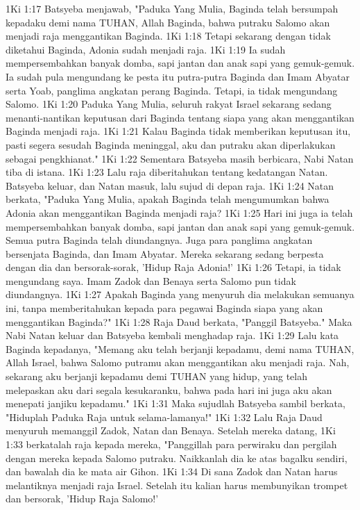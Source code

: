 1Ki 1:17  Batsyeba menjawab, "Paduka Yang Mulia, Baginda telah bersumpah kepadaku demi nama TUHAN, Allah Baginda, bahwa putraku Salomo akan menjadi raja menggantikan Baginda.
1Ki 1:18  Tetapi sekarang dengan tidak diketahui Baginda, Adonia sudah menjadi raja.
1Ki 1:19  Ia sudah mempersembahkan banyak domba, sapi jantan dan anak sapi yang gemuk-gemuk. Ia sudah pula mengundang ke pesta itu putra-putra Baginda dan Imam Abyatar serta Yoab, panglima angkatan perang Baginda. Tetapi, ia tidak mengundang Salomo.
1Ki 1:20  Paduka Yang Mulia, seluruh rakyat Israel sekarang sedang menanti-nantikan keputusan dari Baginda tentang siapa yang akan menggantikan Baginda menjadi raja.
1Ki 1:21  Kalau Baginda tidak memberikan keputusan itu, pasti segera sesudah Baginda meninggal, aku dan putraku akan diperlakukan sebagai pengkhianat."
1Ki 1:22  Sementara Batsyeba masih berbicara, Nabi Natan tiba di istana.
1Ki 1:23  Lalu raja diberitahukan tentang kedatangan Natan. Batsyeba keluar, dan Natan masuk, lalu sujud di depan raja.
1Ki 1:24  Natan berkata, "Paduka Yang Mulia, apakah Baginda telah mengumumkan bahwa Adonia akan menggantikan Baginda menjadi raja?
1Ki 1:25  Hari ini juga ia telah mempersembahkan banyak domba, sapi jantan dan anak sapi yang gemuk-gemuk. Semua putra Baginda telah diundangnya. Juga para panglima angkatan bersenjata Baginda, dan Imam Abyatar. Mereka sekarang sedang berpesta dengan dia dan bersorak-sorak, 'Hidup Raja Adonia!'
1Ki 1:26  Tetapi, ia tidak mengundang saya. Imam Zadok dan Benaya serta Salomo pun tidak diundangnya.
1Ki 1:27  Apakah Baginda yang menyuruh dia melakukan semuanya ini, tanpa memberitahukan kepada para pegawai Baginda siapa yang akan menggantikan Baginda?"
1Ki 1:28  Raja Daud berkata, "Panggil Batsyeba." Maka Nabi Natan keluar dan Batsyeba kembali menghadap raja.
1Ki 1:29  Lalu kata Baginda kepadanya, "Memang aku telah berjanji kepadamu, demi nama TUHAN, Allah Israel, bahwa Salomo putramu akan menggantikan aku menjadi raja. Nah, sekarang aku berjanji kepadamu demi TUHAN yang hidup, yang telah melepaskan aku dari segala kesukaranku, bahwa pada hari ini juga aku akan menepati janjiku kepadamu."
1Ki 1:31  Maka sujudlah Batsyeba sambil berkata, "Hiduplah Paduka Raja untuk selama-lamanya!"
1Ki 1:32  Lalu Raja Daud menyuruh memanggil Zadok, Natan dan Benaya. Setelah mereka datang,
1Ki 1:33  berkatalah raja kepada mereka, "Panggillah para perwiraku dan pergilah dengan mereka kepada Salomo putraku. Naikkanlah dia ke atas bagalku sendiri, dan bawalah dia ke mata air Gihon.
1Ki 1:34  Di sana Zadok dan Natan harus melantiknya menjadi raja Israel. Setelah itu kalian harus membunyikan trompet dan bersorak, 'Hidup Raja Salomo!'
